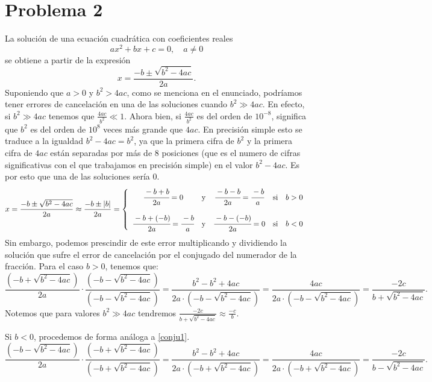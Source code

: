 \documentclass[a4paper]{article}
\begin{document}
\section*{Problema 2}
La solución de una ecuación cuadrática con coeficientes reales $$ax^2+bx+c=0,\quad a\ne0$$ se obtiene a partir de la expresión 
\begin{equation}
    x=\frac{-b\pm\sqrt{b^2-4ac}}{2a}.
    \label{2}
\end{equation}
Suponiendo que $a>0$ y $b^2>4ac$, como se menciona en el enunciado, podríamos tener errores de cancelación en una de las soluciones cuando $b^2\gg 4ac$. En efecto, si $b^2\gg4ac$ tenemos que $\frac{4ac}{b^2}\ll1$. Ahora bien, si $\frac{4ac}{b^2}$ es del orden de $10^{-8}$, significa que $b^2$ es del orden de $10^8$ veces más grande que $4ac$. En precisión simple esto se traduce a la igualdad $b^2-4ac=b^2$, ya que la primera cifra de $b^2$ y la primera cifra de $4ac$ están separadas por más de 8 posiciones (que es el numero de cifras significativas con el que trabajamos en precisión simple) en el valor $b^2-4ac$. Es por esto que una de las soluciones sería 0.
\begin{equation}
x=\frac{-b\pm\sqrt{b^2-4ac}}{2a}\approx\frac{-b\pm|b|}{2a}=\left\{\begin{array}{ccccc} \cfrac{-b+b}{2a}=0 & \text{y} & \cfrac{-b-b}{2a}=\cfrac{-b}{a} & \text{si} & b>0\\\\ \cfrac{-b+(-b)}{2a}=\cfrac{-b}{a} & \text{y} & \cfrac{-b-(-b)}{2a}=0 & \text{si} & b<0
\end{array}\right.
\end{equation}
Sin embargo, podemos prescindir de este error multiplicando y dividiendo la solución que sufre el error de cancelación por el conjugado del numerador de la fracción. Para el caso $b>0$, tenemos que:
\begin{equation}
\frac{(-b+\sqrt{b^2-4ac})}{2a}\cdot\frac{(-b-\sqrt{b^2-4ac})}{(-b-\sqrt{b^2-4ac})}=\frac{b^2-b^2+4ac}{2a\cdot(-b-\sqrt{b^2-4ac})}=\frac{4ac}{2a\cdot(-b-\sqrt{b^2-4ac})}=\frac{-2c}{b+\sqrt{b^2-4ac}}.	
\label{conju1}
\end{equation} 
Notemos que para valores $b^2\gg4ac$ tendremos $\displaystyle\frac{-2c}{b+\sqrt{b^2-4ac}}\approx \frac{-c}{b}$.\par Si $b<0$, procedemos de forma análoga a \eqref{conju1}.
\begin{equation}
\frac{(-b-\sqrt{b^2-4ac})}{2a}\cdot\frac{(-b+\sqrt{b^2-4ac})}{(-b+\sqrt{b^2-4ac})}=\frac{b^2-b^2+4ac}{2a\cdot(-b+\sqrt{b^2-4ac})}=\frac{4ac}{2a\cdot(-b+\sqrt{b^2-4ac})}=\frac{-2c}{b-\sqrt{b^2-4ac}}	.
\label{conju2}
\end{equation}
\end{document}
